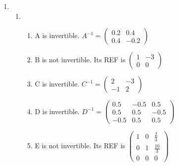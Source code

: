 \documentclass{article}
\begin{document}
\begin{enumerate}
\begin{enumerate}
\end{enumerate}

\item

\begin{enumerate}

\item

\begin{enumerate}

\item A is invertible. $A^{-1} =  \left(\begin{array}{cc} 0.2 & 0.4 \\ 0.4 & -0.2 \end{array} \right)$
\item B is not invertible. Its REF is $\left(\begin{array}{cc} 1 & -3 \\ 0 & 0 \end{array} \right)$
\item C is invertible. $C^{-1} =  \left(\begin{array}{cc} 2 & -3 \\ -1 & 2 \end{array} \right)$
\item D is invertible. $D^{-1} =  \left(\begin{array}{ccc} 0.5 & -0.5 & 0.5 \\ 0.5 & 0.5 & -0.5 \\ -0.5 & 0.5 & 0.5 \end{array} \right)$
\item E is not invertible. Its REF is $\left(\begin{array}{ccc} 1 & 0 & \frac{2}{3} \\ 0 & 1 & \frac{10}{3} \\ 0 & 0 & 0\end{array}\right)$

\end {enumerate}


\end{enumerate}
\end{enumerate}
\end{document}
